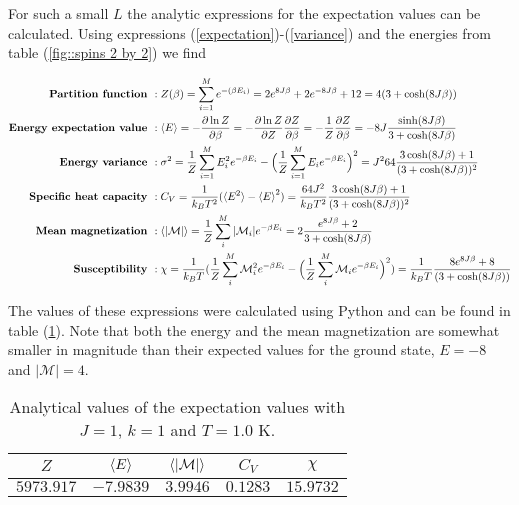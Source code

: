 \documentclass[11pt]{article}
\begin{document}
\begin{flushleft}
For such a small $L$ the analytic expressions for the expectation values can be calculated. Using expressions (\ref{expectation})-(\ref{variance}) and the energies from table (\ref{fig::spins 2 by 2}) we find



\begin{align*}
\textbf{Partition function } &:
Z(\beta) = \sum_{i=1}^M e^{-(\beta E_i)}
= 2 e^{8J \beta} + 2 e^{-8J \beta} + 12
= 4(3 + \cosh (8 J \beta))\\
\textbf{Energy expectation value } &:
\braket{E} = - \frac{\partial \ln Z}{\partial \beta}= - \frac{\partial \ln Z}{\partial Z} \frac{\partial Z}{\partial \beta} = - \frac{1}{Z} \frac{\partial Z}{\partial \beta}
= - 8J \frac{\sinh(8J \beta)}{3 + \cosh(8J \beta)}  \\
\textbf{Energy variance } &:
\sigma^2 = \frac{1}{Z} \sum_{i=1}^M E_i^2 e^{- \beta E_i} - \Big(
\frac{1}{Z} \sum_{i=1}^M E_i e^{- \beta E_i} 
\Big)^2 = J^264 \frac{
3\cosh (8J \beta) + 1}{ (3 + \cosh (8 J \beta))^2}\\
\textbf{Specific heat capacity } &:
C_V = \frac{1}{k_B T^2} (\braket{E^2} - \braket{E}^2) = \frac{64J^2}{k_B T^2}
\frac{3\cosh (8J \beta) + 1}{ (3 + \cosh (8 J \beta))^2}\\
\textbf{Mean magnetization } &:
\braket{|\mathcal{M}|} 
= \frac{1}{Z} \sum_i^M |\mathcal{M}_i| e^{- \beta E_i} =2 \frac{e^{8J \beta} + 2 }{3 + \cosh (8 J \beta)} \\
\textbf{Susceptibility } &:
\chi = \frac{1}{k_B T} (\frac{1}{Z} \sum_i^M \mathcal{M}_i^2 e^{- \beta E_i}- \Big(\frac{1}{Z} \sum_i^M \mathcal{M}_i e^{- \beta E_i}\Big)^2)
= \frac{1}{k_B T} 
\frac{8e^{8J \beta} +8}{(3 + \cosh (8 J \beta))} \\
\end{align*}

\end{flushleft}

\begin{flushleft}

The values of these expressions were calculated using Python and can be found in table (\ref{Fig::analytical}). Note that both the energy and the mean magnetization are somewhat smaller in magnitude than their expected values for the ground state, $E=-8$ and $|\mathcal{M}| = 4$.

\begin{table}[H]
\centering
\begin{tabular}{|c|c|c|c|c|}
\hline
$Z$ &$\braket{E}$ & $\braket{|\mathcal{M}|}$ & $C_V$ & $\chi$\\
\hline
$5973.917$ & $-7.9839$ & $3.9946$ & $0.1283$ & $15.9732$\\
\hline
\end{tabular}
\caption{Analytical values of the expectation values with  $J=1$, $k=1$ and $T=1.0$ K.}
\label{Fig::analytical}
\end{table}
\end{flushleft}
\end{document}
